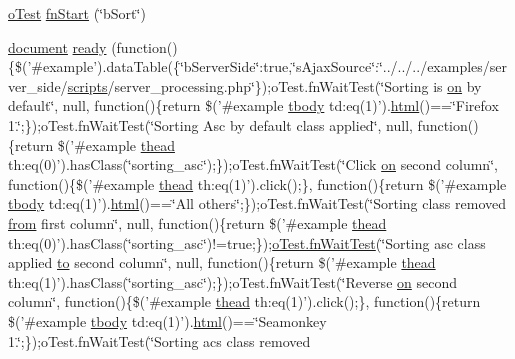 \begin{DoxyCompactItemize}
\item 
\hyperlink{unit__test_8js_a3b2d259e2df3b6860d9047a92d09d0d6}{o\+Test} \hyperlink{4__server-side_2b_sort_8js_ab1fbfdcd8245f3110045c47244353f10}{fn\+Start} (\char`\"{}b\+Sort\char`\"{})
\item 
\hyperlink{outside_events_8js_aa14f8e0338cced6720590fd2ea13bd4b}{document} \hyperlink{4__server-side_2b_sort_8js_a90902779b1ac32b6f26f141959ae6e2b}{ready} (function()\{\$('\#example').data\+Table(\{\char`\"{}b\+Server\+Side\char`\"{}\+:true,\char`\"{}s\+Ajax\+Source\char`\"{}\+:\char`\"{}../../../examples/server\+\_\+side/\hyperlink{tinymce_8jquery_8dev_8js_a09066d4d580eeec222f858d588b4cdef}{scripts}/server\+\_\+processing.\+php\char`\"{}\});o\+Test.\+fn\+Wait\+Test(\char`\"{}Sorting is \hyperlink{fullpage_2plugin_8min_8js_a1cfa98b7fed2aaf9fee3b68dbb7f9497}{on} by default\char`\"{}, null, function()\{return \$('\#example \hyperlink{core_8constructor_8js_a99b0542c7c50fe8757c55bf9dac5f3be}{tbody} td\+:eq(1)').\hyperlink{tinymce_8jquery_8dev_8js_ac2090bcf2ff968c0083d5de53a6544f3}{html}()==\char`\"{}Firefox 1.\char`\"{};\});o\+Test.\+fn\+Wait\+Test(\char`\"{}Sorting Asc by default class applied\char`\"{}, null, function()\{return \$('\#example \hyperlink{core_8constructor_8js_a856be760b6816c9591ce69f0a2b43693}{thead} th\+:eq(0)').has\+Class(\char`\"{}sorting\+\_\+asc\char`\"{});\});o\+Test.\+fn\+Wait\+Test(\char`\"{}Click \hyperlink{fullpage_2plugin_8min_8js_a1cfa98b7fed2aaf9fee3b68dbb7f9497}{on} second column\char`\"{}, function()\{\$('\#example \hyperlink{core_8constructor_8js_a856be760b6816c9591ce69f0a2b43693}{thead} th\+:eq(1)').click();\}, function()\{return \$('\#example \hyperlink{core_8constructor_8js_a99b0542c7c50fe8757c55bf9dac5f3be}{tbody} td\+:eq(1)').\hyperlink{tinymce_8jquery_8dev_8js_ac2090bcf2ff968c0083d5de53a6544f3}{html}()==\char`\"{}All others\char`\"{};\});o\+Test.\+fn\+Wait\+Test(\char`\"{}Sorting class removed \hyperlink{jquery-ui_8js_ace03b192fd101a1c5648340bc09b7229}{from} first column\char`\"{}, null, function()\{return \$('\#example \hyperlink{core_8constructor_8js_a856be760b6816c9591ce69f0a2b43693}{thead} th\+:eq(0)').has\+Class(\char`\"{}sorting\+\_\+asc\char`\"{})!=true;\});\hyperlink{onhold_24__server-side_2__zero__config_8js_ab25c4d596771c0133cdc45178ce72c3d}{o\+Test.\+fn\+Wait\+Test}(\char`\"{}Sorting asc class applied \hyperlink{jquery-ui_8js_af6086621f45baa2cf538f19e45d3c263}{to} second column\char`\"{}, null, function()\{return \$('\#example \hyperlink{core_8constructor_8js_a856be760b6816c9591ce69f0a2b43693}{thead} th\+:eq(1)').has\+Class(\char`\"{}sorting\+\_\+asc\char`\"{});\});o\+Test.\+fn\+Wait\+Test(\char`\"{}Reverse \hyperlink{fullpage_2plugin_8min_8js_a1cfa98b7fed2aaf9fee3b68dbb7f9497}{on} second column\char`\"{}, function()\{\$('\#example \hyperlink{core_8constructor_8js_a856be760b6816c9591ce69f0a2b43693}{thead} th\+:eq(1)').click();\}, function()\{return \$('\#example \hyperlink{core_8constructor_8js_a99b0542c7c50fe8757c55bf9dac5f3be}{tbody} td\+:eq(1)').\hyperlink{tinymce_8jquery_8dev_8js_ac2090bcf2ff968c0083d5de53a6544f3}{html}()==\char`\"{}Seamonkey 1.\char`\"{};\});o\+Test.\+fn\+Wait\+Test(\char`\"{}Sorting acs class removed 
\end{DoxyCompactItemize}
